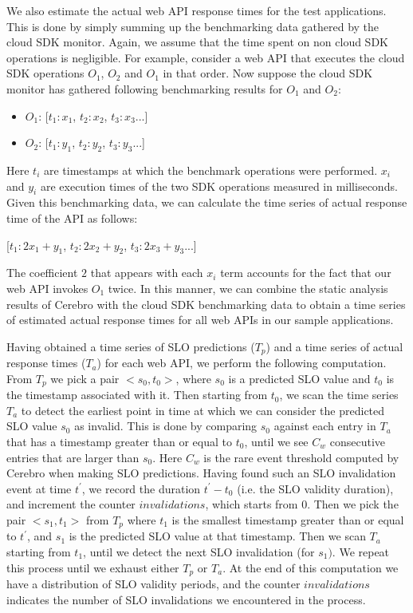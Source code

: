We also estimate the actual web API response times for the test applications. 
This is done by simply summing up the benchmarking data gathered by the cloud 
SDK monitor. Again, we assume that the time spent on non cloud SDK operations
is negligible. For example,
consider a web API that executes the cloud SDK operations $O_{1}$, $O_{2}$ and $O_{1}$ in that order. 
Now suppose the cloud SDK monitor has gathered following benchmarking results for $O_{1}$ and
$O_{2}$:

\begin{itemize}
\item $O_{1}$: [$t_{1}:x_{1}$, $t_{2}:x_{2}$, $t_{3}:x_{3}$...]
\item $O_{2}$: [$t_{1}:y_{1}$, $t_{2}:y_{2}$, $t_{3}:y_{3}$...]
\end{itemize}

Here $t_{i}$ are timestamps at which the benchmark operations were performed. $x_{i}$ and $y_{i}$ are
execution times of the two SDK operations measured in milliseconds. Given this benchmarking data,
we can calculate the time series of actual response time of the API as follows:

[$t_{1}:2x_{1}+y_{1}$, $t_{2}:2x_{2}+y_{2}$, $t_{3}:2x_{3}+y_{3}$...]

The coefficient $2$ that appears with each $x_{i}$ term accounts for the fact that our web API
invokes $O_{1}$ twice. In this manner, we can combine the static analysis
results of Cerebro with the cloud SDK benchmarking data to obtain a time series of estimated
actual response times for all web APIs in our sample applications.

Having obtained a time series of SLO predictions ($T_{p}$) and a time series of actual response 
times ($T_{a}$) for each web API, we perform the following computation. From $T_{p}$ we pick a
pair $<s_{0},t_{0}>$, where $s_{0}$ is a predicted SLO value and $t_{0}$ is the timestamp associated with it. 
Then starting from $t_{0}$, we scan the time series $T_{a}$ to detect the earliest point in time
at which we can consider the predicted SLO value $s_{0}$ as invalid. This is done by comparing $s_{0}$
against each entry in $T_{a}$ that has a timestamp greater than or equal to $t_{0}$, until we see $C_{w}$ 
consecutive entries that are larger than $s_{0}$. Here $C_{w}$ is the rare event threshold 
computed by Cerebro when making SLO predictions. Having found such an SLO invalidation
event at time $t^{\prime}$, we record the duration $t^{\prime} - t_{0}$ (i.e. the SLO validity duration), and 
increment the counter $invalidations$, 
which starts from $0$. Then we pick the pair $<s_{1},t_{1}>$ from $T_{p}$ where $t_{1}$ is the smallest
timestamp greater than or equal to $t^{\prime}$, and $s_{1}$ is the predicted SLO value at that timestamp.
Then we scan $T_{a}$ starting from $t_{1}$, until we detect the next SLO invalidation (for $s_{1})$. 
We repeat this process
until we exhaust either $T_{p}$ or $T_{a}$. At the end of this computation we have a distribution of SLO
validity periods, and the counter $invalidations$ indicates the number of SLO invalidations we encountered
in the process.

